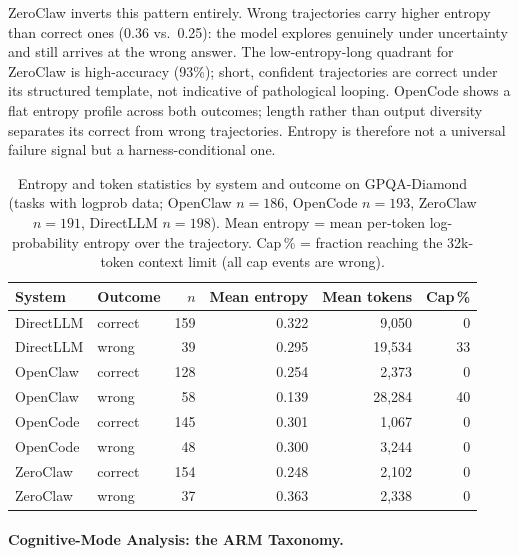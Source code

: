ZeroClaw inverts this pattern entirely.
Wrong trajectories carry higher entropy than correct ones (0.36 vs.\ 0.25): the
model explores genuinely under uncertainty and still arrives at the wrong answer.
The low-entropy-long quadrant for ZeroClaw is high-accuracy (93\%); short,
confident trajectories are correct under its structured template, not indicative
of pathological looping.
OpenCode shows a flat entropy profile across both outcomes; length rather than
output diversity separates its correct from wrong trajectories.
Entropy is therefore not a universal failure signal but a harness-conditional one.

\begin{table}[t]
\centering
\small
\caption{%
  Entropy and token statistics by system and outcome on GPQA-Diamond (tasks with
  logprob data; OpenClaw $n=186$, OpenCode $n=193$, ZeroClaw $n=191$,
  DirectLLM $n=198$).
  Mean entropy = mean per-token log-probability entropy over the trajectory.
  Cap\,\% = fraction reaching the 32k-token context limit (all cap events are
  wrong).
}
\label{tab:gpqa-entropy}
\setlength{\tabcolsep}{4pt}
\begin{tabular}{llrrrr}
\toprule
System & Outcome & $n$ & Mean entropy & Mean tokens & Cap\,\% \\
\midrule
DirectLLM & correct & 159 & 0.322 &  9{,}050 &  0 \\
DirectLLM & wrong   &  39 & 0.295 & 19{,}534 & 33 \\
\midrule
OpenClaw  & correct & 128 & 0.254 &  2{,}373 &  0 \\
OpenClaw  & wrong   &  58 & 0.139 & 28{,}284 & 40 \\
\midrule
OpenCode  & correct & 145 & 0.301 &  1{,}067 &  0 \\
OpenCode  & wrong   &  48 & 0.300 &  3{,}244 &  0 \\
\midrule
ZeroClaw  & correct & 154 & 0.248 &  2{,}102 &  0 \\
ZeroClaw  & wrong   &  37 & 0.363 &  2{,}338 &  0 \\
\bottomrule
\end{tabular}
\end{table}

\paragraph{Cognitive-Mode Analysis: the ARM Taxonomy.}

